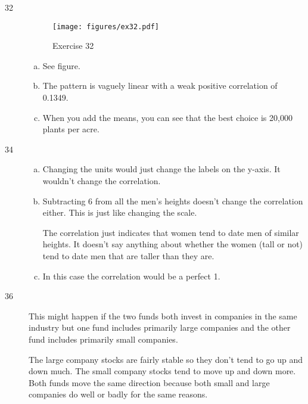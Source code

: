 \documentclass[letterpaper, landscape]{exam}
\begin{document}
\begin{description}
      \item[32]
        \begin{figure}[H]
          \centering
          \texttt{[image: figures/ex32.pdf]}
          \caption{Exercise 32}
        \end{figure}\label{fig:ex32}

        \begin{enumerate}[(a)]
          \item See figure.

          \item The pattern is vaguely linear with a weak positive correlation
            of 0.1349.

          \item When you add the means, you can see that the best choice is
            20,000 plants per acre.

        \end{enumerate}

      \item[34]
        \begin{enumerate}[(a)]
          \item Changing the units would just change the labels on the y-axis.  It
          wouldn't change the correlation.  

          \item Subtracting 6 from all the men's heights doesn't change the
            correlation either.  This is just like changing the scale.

          The correlation just indicates that women tend to date men of similar
          heights.  It doesn't say anything about whether the women (tall or not)
          tend to date men that are taller than they are.

          \item In this case the correlation would be a perfect 1.
        \end{enumerate}

      \item[36] This might happen if the two funds both invest in companies in
        the same industry but one fund includes primarily large companies and
        the other fund includes primarily small companies.  
        
        The large company stocks are fairly stable so they don't tend to go up
        and down much.  The small company stocks tend to move up and down more.
        Both funds move the same direction because both small and large
        companies do well or badly for the same reasons.


\end{description}
\end{document}
